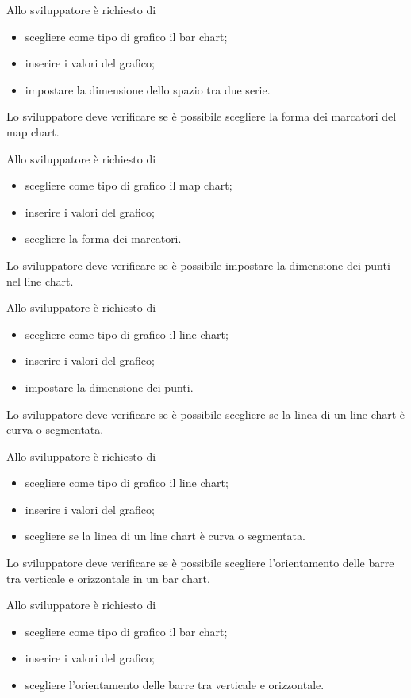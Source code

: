 		Allo sviluppatore è richiesto di
		\begin{itemize}
			\item scegliere come tipo di grafico il bar chart;
			\item inserire i valori del grafico;
			\item impostare la dimensione dello spazio tra due serie.
		\end{itemize}

	Lo sviluppatore deve verificare se è possibile scegliere la forma dei marcatori del map chart.

		Allo sviluppatore è richiesto di
		\begin{itemize}
			\item scegliere come tipo di grafico il map chart;
			\item inserire i valori del grafico;
			\item scegliere la forma dei marcatori.
		\end{itemize}

	Lo sviluppatore deve verificare se è possibile impostare la dimensione dei punti nel line chart.

		Allo sviluppatore è richiesto di
		\begin{itemize}
			\item scegliere come tipo di grafico il line chart;
			\item inserire i valori del grafico;
			\item impostare la dimensione dei punti.
		\end{itemize}

	Lo sviluppatore deve verificare se è possibile scegliere se la linea di un line chart è curva o segmentata.

		Allo sviluppatore è richiesto di
		\begin{itemize}
			\item scegliere come tipo di grafico il line chart;
			\item inserire i valori del grafico;
			\item scegliere se la linea di un line chart è curva o segmentata.
		\end{itemize}

	Lo sviluppatore deve verificare se è possibile scegliere l'orientamento delle barre tra verticale e orizzontale in un bar chart.

		Allo sviluppatore è richiesto di
		\begin{itemize}
			\item scegliere come tipo di grafico il bar chart;
			\item inserire i valori del grafico;
			\item scegliere l'orientamento delle barre tra verticale e orizzontale.
		\end{itemize}

